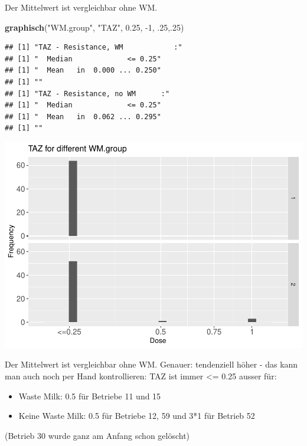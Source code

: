 \documentclass[
]{article}
\newenvironment{Shaded}{\begin{snugshade}}{\end{snugshade}}
\newcommand{\DecValTok}[1]{\textcolor[rgb]{0.00,0.00,0.81}{#1}}
\newcommand{\FloatTok}[1]{\textcolor[rgb]{0.00,0.00,0.81}{#1}}
\newcommand{\KeywordTok}[1]{\textcolor[rgb]{0.13,0.29,0.53}{\textbf{#1}}}
\newcommand{\NormalTok}[1]{#1}
\newcommand{\StringTok}[1]{\textcolor[rgb]{0.31,0.60,0.02}{#1}}
\providecommand{\tightlist}{%
  \setlength{\itemsep}{0pt}\setlength{\parskip}{0pt}}
\begin{document}
Der Mittelwert ist vergleichbar ohne WM.

\begin{Shaded}
\begin{Highlighting}[]
  \KeywordTok{graphisch}\NormalTok{(}\StringTok{"WM.group"}\NormalTok{, }\StringTok{"TAZ"}\NormalTok{, }\FloatTok{0.25}\NormalTok{, }\DecValTok{-1}\NormalTok{, }\FloatTok{.25}\NormalTok{,.}\DecValTok{25}\NormalTok{)  }
\end{Highlighting}
\end{Shaded}

\begin{verbatim}
## [1] "TAZ - Resistance, WM            :"
## [1] "  Median             <= 0.25"
## [1] "  Mean   in  0.000 ... 0.250"
## [1] ""
## [1] "TAZ - Resistance, no WM      :"
## [1] "  Median             <= 0.25"
## [1] "  Mean   in  0.062 ... 0.295"
## [1] ""
\end{verbatim}

\includegraphics{Verteilungen_files/figure-latex/unnamed-chunk-37-1.pdf}

Der Mittelwert ist vergleichbar ohne WM. Genauer: tendenziell höher -
das kann man auch noch per Hand kontrollieren: TAZ ist immer \textless=
0.25 ausser für:

\begin{itemize}
\tightlist
\item
  Waste Milk: 0.5 für Betriebe 11 und 15
\item
  Keine Waste Milk: 0.5 für Betriebe 12, 59 und 3*1 für Betrieb 52
\end{itemize}

(Betrieb 30 wurde ganz am Anfang schon gelöscht)
\end{document}

